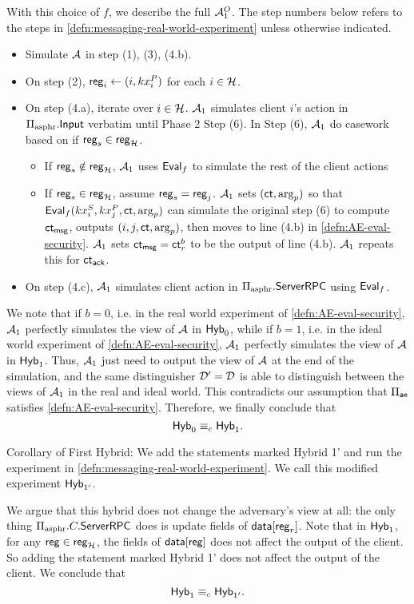 With this choice of $f$, we describe the full $\mathcal{A}_1^O$. The step numbers below refers to the steps in \cref{defn:messaging-real-world-experiment} unless otherwise indicated.
\begin{itemize}
    \item Simulate $\mathcal{A}$ in step (1), (3), (4.b).
    \item On step (2), $\mathsf{reg}_i \leftarrow (i, kx_i^{P})$ for each $i \in \mathcal{H}$. 
    \item On step (4.a), iterate over $i \in \mathcal{H}$. $\mathcal{A}_1$ simulates client $i$'s action in $\Pi_{\text{asphr}}.\mathsf{Input}$ verbatim until Phase 2 Step (6). In Step (6), $\mathcal{A}_1$ do casework based on if $\mathsf{reg}_s \in \mathsf{reg}_{\mathcal{H}}$. 
    \begin{itemize}
        \item  If $\mathsf{reg}_s \notin \mathsf{reg}_{\mathcal{H}}$, $\mathcal{A}_1$ uses $\mathsf{Eval}_f$ to simulate the rest of the client actions
        \item  If $\mathsf{reg}_s \in \mathsf{reg}_{\mathcal{H}}$, assume $\mathsf{reg}_s = \mathsf{reg}_j$. $\mathcal{A}_1$ sets $(\mathsf{ct}, \arg_p)$ so that $\mathsf{Eval}_f(kx^S_i, kx^P_j, \mathsf{ct}, \arg_p)$ can simulate the original step (6) to compute $\mathsf{ct}_{\mathsf{msg}}$, outputs $(i, j, \mathsf{ct}, \arg_p)$, then moves to line (4.b) in \cref{defn:AE-eval-security}. $\mathcal{A}_1$ sets $\mathsf{ct}_{\mathsf{msg}} = \mathsf{ct}^b_r$ to be the output of line (4.b). $\mathcal{A}_1$ repeats this for $\mathsf{ct}_{\mathsf{ack}}$.
    \end{itemize}
   
    \item On step (4.c), $\mathcal{A}_1$ simulates client action in $\Pi_{\text{asphr}}.\mathsf{ServerRPC}$ using $\mathsf{Eval}_f$.
\end{itemize}
We note that if $b = 0$, i.e. in the real world experiment of \cref{defn:AE-eval-security}, $\mathcal{A}_1$ perfectly simulates the view of $\mathcal{A}$ in $\mathsf{Hyb}_0$, while if $b = 1$, i.e. in the ideal world experiment of \cref{defn:AE-eval-security}, $\mathcal{A}_1$ perfectly simulates the view of $\mathcal{A}$ in $\mathsf{Hyb}_1$. Thus, $\mathcal{A}_1$ just need to output the view of $\mathcal{A}$ at the end of the simulation, and the same distinguisher $\mathcal{D}' = \mathcal{D}$ is able to distinguish between the views of $\mathcal{A}_1$ in the real and ideal world. This contradicts our assumption that $\Pi_{\mathsf{ae}}$ satisfies \cref{defn:AE-eval-security}. Therefore, we finally conclude that
$$\mathsf{Hyb}_0 \equiv_c \mathsf{Hyb}_1.$$

Corollary of First Hybrid: We add the statements marked Hybrid 1' and run the experiment in \cref{defn:messaging-real-world-experiment}. We call this modified experiment $\mathsf{Hyb}_{1'}$.

We argue that this hybrid does not change the adversary's view at all: the only thing $\Pi_{\text{asphr}}.C.\mathsf{ServerRPC}$ does is update fields of $\mathsf{data}[\mathsf{reg}_r]$. Note that in $\mathsf{Hyb}_1$, for any $\mathsf{reg} \in \mathsf{reg}_{\mathcal{H}}$, the fields of $\mathsf{data}[\mathsf{reg}]$ does not affect the output of the client. So adding the statement marked Hybrid 1' does not affect the output of the client. We conclude that
$$\mathsf{Hyb}_1 \equiv_c \mathsf{Hyb}_{1'}.$$

